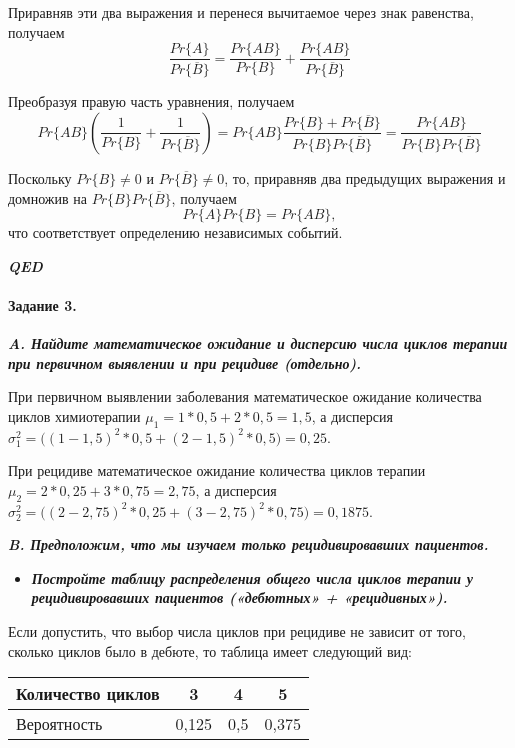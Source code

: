 \documentclass[12pt, a4paper]{article}
\providecommand{\tightlist}{%
  \setlength{\itemsep}{0pt}\setlength{\parskip}{0pt}}
\let\oldparagraph\paragraph
\renewcommand{\paragraph}[1]{\oldparagraph{#1}\mbox{}}
\begin{document}
Приравняв эти два выражения и перенеся вычитаемое через знак равенства, получаем \[
\frac{Pr\{A\} }{Pr\{\overline{B}\} } = \frac{Pr\{AB\} }{Pr\{B\} } + \frac{Pr\{AB\}}{Pr\{\overline{B}\} } 
\]

Преобразуя правую часть уравнения, получаем \[
Pr\{AB\} \left( \frac{1}{Pr\{B\} } + \frac{1}{Pr\{\overline{B}\} } \right) = Pr\{AB\} \frac{Pr\{B\} + Pr\{\overline{B}\} } {Pr\{B\} Pr\{\overline{B}\} } 
= \frac{Pr\{AB\} } {Pr\{B\} Pr\{\overline{B}\} }
\]

Поскольку \(Pr\{B\} \neq 0\) и \(Pr\{\overline{B}\} \neq 0\), то, приравняв
два предыдущих выражения и домножив на \(Pr\{B\}Pr\{\overline{B}\}\),
получаем \[
Pr\{A\}Pr\{B\} = Pr\{AB\},
\] что соответствует определению независимых событий.

\begin{center}
    \textit{\textbf{QED}}    
\end{center}

\paragraph{Задание 3.}\label{-3.}

\textit{\textbf{A. Найдите математическое ожидание и дисперсию числа
циклов терапии при первичном выявлении и при рецидиве (отдельно).}}

При первичном выявлении заболевания математическое ожидание количества
циклов химиотерапии \(\mu_1 = 1*0,5 + 2*0,5 = 1,5\), а дисперсия
\(\sigma^2_1 = \big( (1-1,5)^2*0,5 + (2-1,5)^2*0,5\big) = 0,25\).

При рецидиве математическое ожидание количества циклов терапии 
\(\mu_2 = 2*0,25 + 3*0,75 = 2,75\), а дисперсия
\(\sigma^2_2 = \big( (2-2,75)^2*0,25 + (3-2,75)^2*0,75\big) = 0,1875\).

\textit{\textbf{B. Предположим, что мы изучаем только рецидивировавших
пациентов.}}

\begin{itemize}
\tightlist
\item
  \textit{\textbf{Постройте таблицу распределения общего числа циклов
  терапии у рецидивировавших пациентов («дебютных» + «рецидивных»).}}
\end{itemize}

Если допустить, что выбор числа циклов при рецидиве не зависит от того,
сколько циклов было в дебюте, то таблица имеет следующий вид:

\begin{table}[h!]
    \centering
    \begin{tabular}{l|ccc}
        \hline
        Количество циклов & 3 & 4 & 5\\
        \hline
        Вероятность & 0,125 & 0,5 & 0,375\\
        \hline
    \end{tabular}
    \label{tab:my_label}
\end{table}
\end{document}
